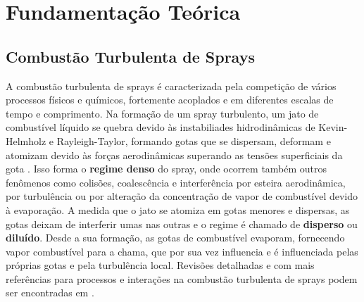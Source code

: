 

\section{Fundamentação Teórica}



\subsection{Combustão Turbulenta de Sprays} \label{sec:teoria}

A combustão turbulenta de sprays é caracterizada pela competição de vários processos físicos e químicos, fortemente acoplados e em diferentes escalas de tempo e comprimento. 
Na formação de um spray turbulento, um jato de combustível líquido se quebra devido às instabiliades hidrodinâmicas de Kevin-Helmholz e Rayleigh-Taylor, formando gotas que se dispersam, deformam e atomizam devido às forças aerodinâmicas superando as tensões superficiais da gota \cite{JennyB2012}.
Isso forma o \textbf{regime denso} do spray, onde ocorrem também outros fenômenos como colisões, coalescência e interferência por esteira aerodinâmica, por turbulência ou por alteração da concentração de vapor de combustível devido à evaporação.
A medida que o jato se atomiza em gotas menores e dispersas, as gotas deixam de interferir umas nas outras e o regime é chamado de \textbf{disperso} ou \textbf{diluído}. 
Desde a sua formação, as gotas de combustível evaporam, fornecendo vapor combustível para a chama, que por sua vez influencia e é influenciada pelas próprias gotas e pela turbulência local.
Revisões detalhadas e com mais referências para processos e interações na combustão turbulenta de sprays podem ser encontradas em \cite{JennyB2012, MasriA2016, SanchezA2015, ZhouL2021,JiangX2010}.

